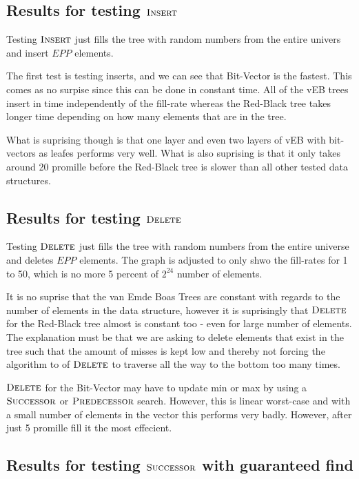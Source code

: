 \documentclass[oneside,11pt,openright]{report}
\newcommand{\Insert}{\textsc{Insert}}
\newcommand{\Delete}{\textsc{Delete}}
\newcommand{\Predecessor}{\textsc{Predecessor}}
\newcommand{\Successor}{\textsc{Successor}}
\begin{document}
\subsection{Results for testing $\Insert$}

Testing $\Insert$ just fills the tree with random numbers from the entire univers and insert $EPP$ elements.



The first test is testing inserts, and we can see that Bit-Vector is the fastest. This comes as no surpise since this can be done in constant time. All of the vEB trees insert in time independently of the fill-rate whereas the Red-Black tree takes longer time depending on how many elements that are in the tree.

What is suprising though is that one layer and even two layers of vEB with bit-vectors as leafes performs very well. What is also suprising is that it only takes around 20 promille before the Red-Black tree is slower than all other tested data structures.

\subsection{Results for testing $\Delete$}

Testing $\Delete$ just fills the tree with random numbers from the entire universe and deletes $EPP$ elements. The graph is adjusted to only shwo the fill-rates for 1 to 50, which is no more 5 percent of $2^{24}$ number of elements.



It is no suprise that the van Emde Boas Trees are constant with regards to the number of elements in the data structure, however it is suprisingly that $\Delete$ for the Red-Black tree almost is constant too - even for large number of elements. The explanation must be that we are asking to delete elements that exist in the tree such that the amount of misses is kept low and thereby not forcing the algorithm to of $\Delete$ to traverse all the way to the bottom too many times.

$\Delete$ for the Bit-Vector may have to update min or max by using a $\Successor$ or $\Predecessor$ search. However, this is linear worst-case and with a small number of elements in the vector this performs very badly. However, after just 5 promille fill it the most effecient. 

\subsection{Results for testing $\Successor$ with guaranteed find}
\end{document}
